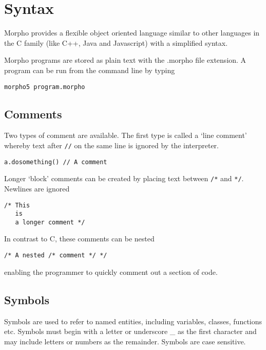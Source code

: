 \hypertarget{syntax}{%
\section{Syntax}\label{syntax}}

Morpho provides a flexible object oriented language similar to other
languages in the C family (like C++, Java and Javascript) with a
simplified syntax.

Morpho programs are stored as plain text with the .morpho file
extension. A program can be run from the command line by typing

\begin{lstlisting}
morpho5 program.morpho
\end{lstlisting}

\hypertarget{comments}{%
\subsection{Comments}\label{comments}}

Two types of comment are available. The first type is called a `line
comment' whereby text after \texttt{//} on the same line is ignored by
the interpreter.

\begin{lstlisting}
a.dosomething() // A comment
\end{lstlisting}

Longer `block' comments can be created by placing text between
\texttt{/*} and \texttt{*/}. Newlines are ignored

\begin{lstlisting}
/* This
   is
   a longer comment */
\end{lstlisting}

In contrast to C, these comments can be nested

\begin{lstlisting}
/* A nested /* comment */ */
\end{lstlisting}

enabling the programmer to quickly comment out a section of code.

\hypertarget{symbols}{%
\subsection{Symbols}\label{symbols}}

Symbols are used to refer to named entities, including variables,
classes, functions etc. Symbols must begin with a letter or underscore
\_ as the first character and may include letters or numbers as the
remainder. Symbols are case sensitive.

